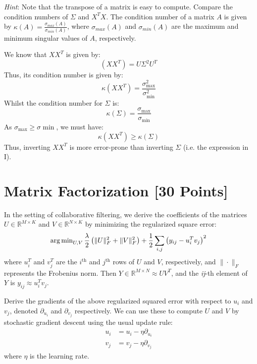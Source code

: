 \textit{Hint}: Note that the transpose of a matrix is easy to compute. Compare the condition numbers of $\Sigma$ and $X^T X$. The condition number of a matrix $A$ is given by $\kappa(A) = \frac{\sigma_{max}(A)}{\sigma_{min}(A)}$, where $\sigma_{max}(A)$ and $\sigma_{min}(A)$ are the maximum and minimum singular values of $A$, respectively.

\begin{solution}
 We know that $XX^T$ is given by:
 \begin{equation}
	 (XX^T) = U\Sigma^2U^T
 \end{equation}
 Thus, its condition number is given by:
 \begin{equation}
	\kappa(XX^T) = \frac{\sigma_{\max}^2}{\sigma_{\min}^2}
 \end{equation}
 Whilst the condition number for $\Sigma$ is:
 \begin{equation}
	 \kappa(\Sigma) = \frac{\sigma_{\max}}{\sigma_{\min}}
 \end{equation}
 As $\sigma_{\max}\geq\sigma{\min}$, we must have:
 \begin{equation}
	\kappa(XX^T)\geq \kappa(\Sigma)
 \end{equation}
 Thus, inverting $XX^T$ is more error-prone than inverting $\Sigma$ (i.e. the expression in I).
\end{solution}


\newpage
\section{Matrix Factorization [30 Points]}

In the setting of collaborative filtering, we derive the coefficients of the matrices $U \in \mathbb{R}^{M \times K}$ and $V \in \mathbb{R}^{N \times K}$ by minimizing the regularized square error:
$$\operatorname{arg\,min}_{U,V} \frac{\lambda}{2} \left( \|U\|_F^2 + \|V\|^2_F \right) + \frac{1}{2}\sum_{i,j} \left( y_{ij} - u_i^Tv_j\right)^2$$
where $u_i^T$ and $v_j^T$ are the $i^{\text{th}}$ and $j^{\text{th}}$ rows of $U$ and $V$, respectively, and $\|\cdot\|_F$ represents the Frobenius norm. Then $Y \in \mathbb{R}^{M \times N} \approx UV^T$, and the \textit{ij}-th element of $Y$ is $y_{ij} \approx u_i^Tv_j$.

\problem[5]
Derive the gradients of the above regularized squared error with respect to $u_i$ and $v_j$, denoted $\partial_{u_i}$ and $\partial_{v_j}$ respectively.  We can use these to compute $U$ and $V$ by stochastic gradient descent using the usual update rule: 
\begin{align*}
u_i &= u_i - \eta \partial_{u_i} \\
v_j &= v_j - \eta \partial_{v_j}
\end{align*}
where $\eta$ is the learning rate.

